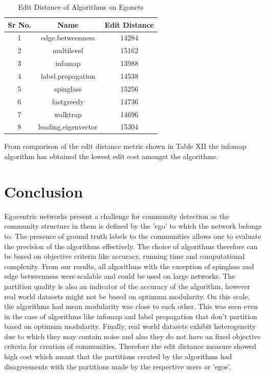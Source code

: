 \begin{table}[H]
\renewcommand{\arraystretch}{1.3}
\caption{Edit Distance of Algorithms on Egonets}
\label{table}
\centering
\begin{tabular}{|c|c|c|}
  \hline
\multicolumn{1}{|c|}{\textbf{Sr No.}} & \multicolumn{1}{|c|}{\textbf{Name}} & \multicolumn{1}{c|}{\textbf{Edit Distance}}  \\
  \hline
  1 & edge.betweenness & 14284\\
   \hline
  2 & multilevel & 15162\\
   \hline
  3 & infomap & 13988\\
   \hline
  4 & label.propagation & 14538\\
   \hline
  5 & spinglass & 15256\\
   \hline
  6 & fastgreedy & 14736\\
   \hline
  7 & walktrap & 14696\\
   \hline
  8 & leading.eigenvector & 15304\\
   \hline
\end{tabular}
\end{table}

From comparison of the edit distance metric shown in Table XII the infomap algorithm has obtained the lowest edit cost amongst the algorithms.



\section{Conclusion}
Egocentric networks present a challenge for community detection as the community structure in them is defined by the 'ego' to which the network belongs to. The presence of ground truth labels to the communities allows one to evaluate the precision of the algorithms effectively. The choice of algorithms therefore can be based on objective criteria like accuracy, running time and computational complexity. From our results, all algorithms with the exception of spinglass and edge betweenness were scalable and could be used on large networks. The partition quality is also an indicator of the accuracy of the algorithm, however real world datasets might not be based on optimum modularity. On this scale, the algorithms had mean modularity was close to each other. This was seen even in the case of algorithms like infomap and label propagation that don't partition based on optimum modularity. Finally, real world datasets exhibit heterogeneity due to which they may contain noise and also they do not have an fixed objective criteria for creation of communities. Therefore the edit distance measure showed high cost which meant that the partitions created by the algorithms had disagreements with the partitions made by the respective users or 'egos'.    
